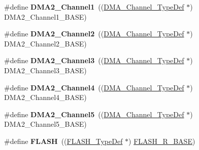 \begin{DoxyCompactItemize}
\item 
\mbox{\label{group___peripheral__declaration_gad86c75e1ff89e03e15570f47962865c8}} 
\#define {\bfseries D\+M\+A2\+\_\+\+Channel1}~((\hyperlink{struct_d_m_a___channel___type_def}{D\+M\+A\+\_\+\+Channel\+\_\+\+Type\+Def} $\ast$) D\+M\+A2\+\_\+\+Channel1\+\_\+\+B\+A\+SE)
\item 
\mbox{\label{group___peripheral__declaration_ga316024020799373b9d8e35c316c74f24}} 
\#define {\bfseries D\+M\+A2\+\_\+\+Channel2}~((\hyperlink{struct_d_m_a___channel___type_def}{D\+M\+A\+\_\+\+Channel\+\_\+\+Type\+Def} $\ast$) D\+M\+A2\+\_\+\+Channel2\+\_\+\+B\+A\+SE)
\item 
\mbox{\label{group___peripheral__declaration_ga6dca52a79587e0ca9a5d669048b4c7eb}} 
\#define {\bfseries D\+M\+A2\+\_\+\+Channel3}~((\hyperlink{struct_d_m_a___channel___type_def}{D\+M\+A\+\_\+\+Channel\+\_\+\+Type\+Def} $\ast$) D\+M\+A2\+\_\+\+Channel3\+\_\+\+B\+A\+SE)
\item 
\mbox{\label{group___peripheral__declaration_ga612b396657695191ad740b0b59bc9f12}} 
\#define {\bfseries D\+M\+A2\+\_\+\+Channel4}~((\hyperlink{struct_d_m_a___channel___type_def}{D\+M\+A\+\_\+\+Channel\+\_\+\+Type\+Def} $\ast$) D\+M\+A2\+\_\+\+Channel4\+\_\+\+B\+A\+SE)
\item 
\mbox{\label{group___peripheral__declaration_ga521c13b7d0f82a6897d47995da392750}} 
\#define {\bfseries D\+M\+A2\+\_\+\+Channel5}~((\hyperlink{struct_d_m_a___channel___type_def}{D\+M\+A\+\_\+\+Channel\+\_\+\+Type\+Def} $\ast$) D\+M\+A2\+\_\+\+Channel5\+\_\+\+B\+A\+SE)
\item 
\mbox{\label{group___peripheral__declaration_ga844ea28ba1e0a5a0e497f16b61ea306b}} 
\#define {\bfseries F\+L\+A\+SH}~((\hyperlink{struct_f_l_a_s_h___type_def}{F\+L\+A\+S\+H\+\_\+\+Type\+Def} $\ast$) \hyperlink{group___peripheral__memory__map_ga8e21f4845015730c5731763169ec0e9b}{F\+L\+A\+S\+H\+\_\+\+R\+\_\+\+B\+A\+SE})
\item 
\mbox{\label{group___peripheral__declaration_gad2d5f875cdc6d696735f20fa23a895c3}} 

\end{DoxyCompactItemize}
